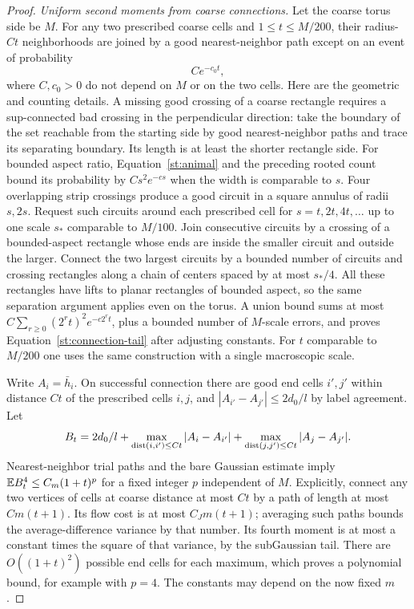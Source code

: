 \begin{proof}
\emph{Uniform second moments from coarse connections.}
Let the coarse torus side be $M$. For any two prescribed coarse cells and
$1\le t\le M/200$, their radius-$Ct$ neighborhoods are joined by a good
nearest-neighbor path except on an event of probability
\begin{equation}\label{st:connection-tail}
 C e^{-c_0t},
\end{equation}
where $C,c_0>0$ do not depend on $M$ or on the two cells.
Here are the geometric and counting details. A missing good crossing of
a coarse rectangle requires a sup-connected bad crossing in the
perpendicular direction: take the boundary of the set reachable from the
starting side by good nearest-neighbor paths and trace its separating
boundary. Its length is at least the shorter rectangle side. For bounded
aspect ratio, Equation~\eqref{st:animal} and the preceding rooted count
bound its probability by $Cs^2e^{-cs}$ when the width is comparable to $s$.
Four overlapping strip crossings produce a good circuit in a square
annulus of radii $s,2s$. Request such circuits around each prescribed cell
for $s=t,2t,4t,\ldots$ up to one scale $s_*$ comparable to $M/100$.
Join consecutive circuits by a crossing of a bounded-aspect rectangle
whose ends are inside the smaller circuit and outside the larger.
Connect the two largest circuits by a bounded number of circuits and
crossing rectangles along a chain of centers spaced by at most $s_*/4$.
All these rectangles have lifts to planar rectangles of bounded aspect,
so the same separation argument applies even on the torus. A union bound
sums at most $C\sum_{r\ge0}(2^rt)^2e^{-c2^rt}$, plus a bounded number of
$M$-scale errors, and proves Equation~\eqref{st:connection-tail} after
adjusting constants. For $t$ comparable to $M/200$ one uses the same
construction with a single macroscopic scale.

Write $A_i=\bar h_i$. On successful connection there are good end cells
$i',j'$ within distance $Ct$ of the prescribed cells $i,j$, and
$|A_{i'}-A_{j'}|\le2d_0/l$ by label agreement. Let
\[
 B_t=2d_0/l+
 \max_{\operatorname{dist}(i,i')\le Ct}|A_i-A_{i'}|
 +\max_{\operatorname{dist}(j,j')\le Ct}|A_j-A_{j'}|.
\]
Nearest-neighbor trial paths and the bare Gaussian estimate imply
$\mathbb E B_t^4\le C_m(1+t)^p$ for a fixed integer $p$ independent of $M$.
Explicitly, connect any two vertices of cells at coarse distance at most
$Ct$ by a path of length at most $C m(t+1)$. Its flow cost is at most
$C_Jm(t+1)$; averaging such paths bounds the average-difference variance
by that number. Its fourth moment is at most a constant times the square
of that variance, by the subGaussian tail. There are $O((1+t)^2)$ possible
end cells for each maximum, which proves a polynomial bound, for example
with $p=4$. The constants may depend on the now fixed $m$.


\end{proof}
